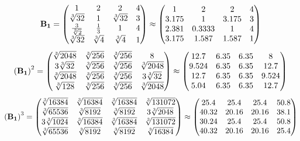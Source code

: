 \documentclass[10pt,a4paper]{article}
\begin{document}
	\[
		\bold{B_1} = 
		\begin{pmatrix}
			{1} {} & {{2}} {} & {{2}} {} & {{4}} {} \\
			{\sqrt[3]{32}} {} & {1} {} & {\sqrt[3]{32}} {} & {{3}} {} \\
			\frac{{3}} {\sqrt[3]{2}} & \frac{1} {{3}} & {1} {} & {{4}} {} \\
			{\sqrt[3]{32}} {} & {\sqrt[3]{4}} {} & {\sqrt[3]{4}} {} & {1} {} \\
		\end{pmatrix}
		\approx
		\begin{pmatrix}
			1        & 2        & 2        & 4        \\
			3.175    & 1        & 3.175    & 3        \\
			2.381    & 0.3333   & 1        & 4        \\
			3.175    & 1.587    & 1.587    & 1        \\
		\end{pmatrix}
	\]
	\[
		\left(\bold{B_1}\right)^{2} = 
		\begin{pmatrix}
			{\sqrt[3]{2048}} {} & {\sqrt[3]{256}} {} & {\sqrt[3]{256}} {} & {{8}} {} \\
			{{3}\sqrt[3]{32}} {} & {\sqrt[3]{256}} {} & {\sqrt[3]{256}} {} & {\sqrt[3]{2048}} {} \\
			{\sqrt[3]{2048}} {} & {\sqrt[3]{256}} {} & {\sqrt[3]{256}} {} & {{3}\sqrt[3]{32}} {} \\
			{\sqrt[3]{128}} {} & {\sqrt[3]{256}} {} & {\sqrt[3]{256}} {} & {\sqrt[3]{2048}} {} \\
		\end{pmatrix}
		\approx
		\begin{pmatrix}
			12.7     & 6.35     & 6.35     & 8        \\
			9.524    & 6.35     & 6.35     & 12.7     \\
			12.7     & 6.35     & 6.35     & 9.524    \\
			5.04     & 6.35     & 6.35     & 12.7     \\
		\end{pmatrix}
	\]
	\[
		\left(\bold{B_1}\right)^{3} = 
		\begin{pmatrix}
			{\sqrt[3]{16384}} {} & {\sqrt[3]{16384}} {} & {\sqrt[3]{16384}} {} & {\sqrt[3]{131072}} {} \\
			{\sqrt[3]{65536}} {} & {\sqrt[3]{8192}} {} & {\sqrt[3]{8192}} {} & {{3}\sqrt[3]{2048}} {} \\
			{{3}\sqrt[3]{1024}} {} & {\sqrt[3]{16384}} {} & {\sqrt[3]{16384}} {} & {\sqrt[3]{131072}} {} \\
			{\sqrt[3]{65536}} {} & {\sqrt[3]{8192}} {} & {\sqrt[3]{8192}} {} & {\sqrt[3]{16384}} {} \\
		\end{pmatrix}
		\approx
		\begin{pmatrix}
			25.4     & 25.4     & 25.4     & 50.8     \\
			40.32    & 20.16    & 20.16    & 38.1     \\
			30.24    & 25.4     & 25.4     & 50.8     \\
			40.32    & 20.16    & 20.16    & 25.4     \\
		\end{pmatrix}
	\]
\end{document}
